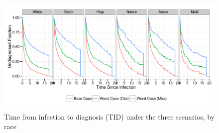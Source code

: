 \documentclass{article}\usepackage[]{graphicx}\usepackage[]{color}
\makeatletter
\def\maxwidth{ %
  \ifdim\Gin@nat@width>\linewidth
    \linewidth
  \else
    \Gin@nat@width
  \fi
}
\newenvironment{knitrout}{}{} %
\makeatother
\begin{document}
\begin{knitrout}\footnotesize
{}\color{fgcolor}\begin{figure}[hb]


{\centering \includegraphics[width=\maxwidth]{figure/minimal-plot_raceTID} 

}

\caption[Time from infection to diagnosis (TID) under the three scenarios, by race]{Time from infection to diagnosis (TID) under the three scenarios, by race\label{fig:plot_raceTID}}
\end{figure}


\end{knitrout}
\end{document}
